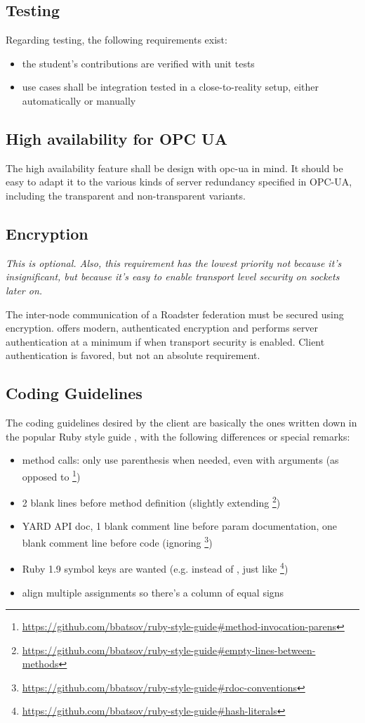 \subsection{Testing}
Regarding testing, the following requirements exist:
\begin{itemize}
	\item the student's contributions are verified with unit tests
	\item use cases shall be integration tested in a close-to-reality setup, either automatically or manually
\end{itemize}

\subsection{High availability for OPC UA}
The high availability feature shall be design with \gls{opc-ua} in mind. It
should be easy to adapt it to the various kinds of server redundancy specified
in OPC-UA, including the transparent and non-transparent variants.

\subsection{Encryption}
\emph{This is optional. Also, this requirement has the lowest priority not
because it's insignificant, but because it's easy to enable transport level
security on \zmq sockets later on.}

The inter-node communication of a Roadster federation must be secured using
encryption. \zmq offers modern, authenticated encryption and performs server authentication at a minimum if when transport security is
enabled. Client authentication is favored, but not an absolute requirement.

\subsection{Coding Guidelines}
The coding guidelines desired by the client are basically the ones written down
in the popular Ruby style guide \cite{rb:style-guide}, with the following
differences or special remarks:

\begin{itemize}
	\item method calls: only use parenthesis when needed, even with arguments (as opposed to \footnote{\url{https://github.com/bbatsov/ruby-style-guide\#method-invocation-parens}})
	\item 2 blank lines before method definition (slightly extending \footnote{\url{https://github.com/bbatsov/ruby-style-guide\#empty-lines-between-methods}})
	\item YARD API doc, 1 blank comment line before param documentation, one blank comment line before code (ignoring \footnote{\url{https://github.com/bbatsov/ruby-style-guide\#rdoc-conventions}})
	\item Ruby 1.9 symbol keys are wanted (e.g.  instead of , just like \footnote{\url{https://github.com/bbatsov/ruby-style-guide\#hash-literals}})
	\item align multiple assignments so there's a column of equal signs
\end{itemize}
